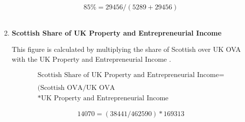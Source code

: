 \begin{enumerate}
\begin{equation} \nonumber
85\% = 29456/(5289+29456)
\end{equation}\\

\newpage

\item \textbf {Scottish Share of UK Property and Entrepreneurial Income}

This figure is calculated by multiplying the share of Scottish over UK OVA \cite{ScotGov2013a, ONS2011c} with the UK Property and Entrepreneurial Income \cite{ONS2011c}.

\begin{equation}
\begin{split}
\text{Scottish Share of UK Property and Entrepreneurial Income} =  \\ \\
(\text{Scottish OVA} / \text{UK OVA}\\
*\text{UK Property and Entrepreneurial Income}
\end{split} \label{eq:2.5.86}
\end{equation}

\begin{equation} \nonumber
14070 = (38441/462590)*169313
\end{equation}\\


\end{enumerate}

